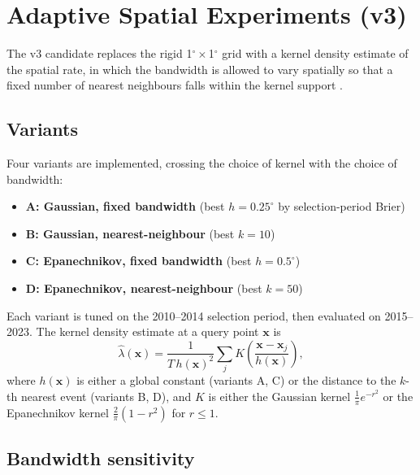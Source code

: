 \documentclass[10pt,a4paper,twocolumn]{article}
\begin{document}
\section{Adaptive Spatial Experiments (v3)}\label{sec:adaptive}

The v3 candidate replaces the rigid 1$^\circ\times$1$^\circ$ grid with a kernel density estimate of the spatial rate, in which the bandwidth is allowed to vary spatially so that a fixed number of nearest neighbours falls within the kernel support \cite{marsan2008, silverman1986}.

\subsection{Variants}

Four variants are implemented, crossing the choice of kernel with the choice of bandwidth:

\begin{itemize}[leftmargin=1.2em,itemsep=2pt,topsep=2pt]
\item \textbf{A: Gaussian, fixed bandwidth} (best $h=0.25^\circ$ by selection-period Brier)
\item \textbf{B: Gaussian, nearest-neighbour} (best $k=10$)
\item \textbf{C: Epanechnikov, fixed bandwidth} (best $h=0.5^\circ$)
\item \textbf{D: Epanechnikov, nearest-neighbour} (best $k=50$)
\end{itemize}

Each variant is tuned on the 2010--2014 selection period, then evaluated on 2015--2023. The kernel density estimate at a query point $\mathbf{x}$ is
\begin{equation}\label{eq:kde}
\hat\lambda(\mathbf{x}) = \frac{1}{T\, h(\mathbf{x})^2} \sum_j K\!\left(\frac{\mathbf{x} - \mathbf{x}_j}{h(\mathbf{x})}\right),
\end{equation}
where $h(\mathbf{x})$ is either a global constant (variants A, C) or the distance to the $k$-th nearest event (variants B, D), and $K$ is either the Gaussian kernel $\frac{1}{\pi}e^{-r^2}$ or the Epanechnikov kernel $\frac{2}{\pi}(1-r^2)$ for $r\leq1$.

\subsection{Bandwidth sensitivity}
\end{document}
